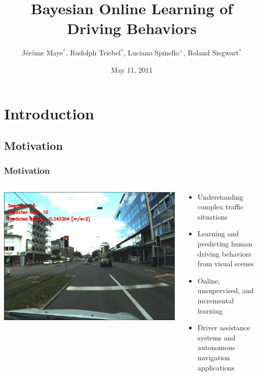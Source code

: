 \documentclass{beamer}
\begin{document}
\title{Bayesian Online Learning of Driving Behaviors}
\author[J\'er\^ome Maye]{
J\'er\^ome Maye$^*$, Rudolph Triebel$^*$, Luciano Spinello$^+$, Roland
  Siegwart$^*$
}
\date{May 11, 2011}

\maketitleframe

\section{Introduction}

\subsection{Motivation}
\begin{frame}[t]
  \frametitle{Motivation}
  \begin{columns}[c]
    \begin{column}{5cm}
      \includegraphics[scale=0.13]{figures/finalResult}
    \end{column}
    \begin{column}{5cm}
      \begin{itemize}
        \item Understanding complex traffic situations
        \item Learning and predicting human driving behaviors from visual scenes
        \item Online, unsupervised, and incremental learning
        \item Driver assistance systems and autonomous navigation applications
      \end{itemize}
    \end{column}
  \end{columns}
\end{frame}
\end{document}
